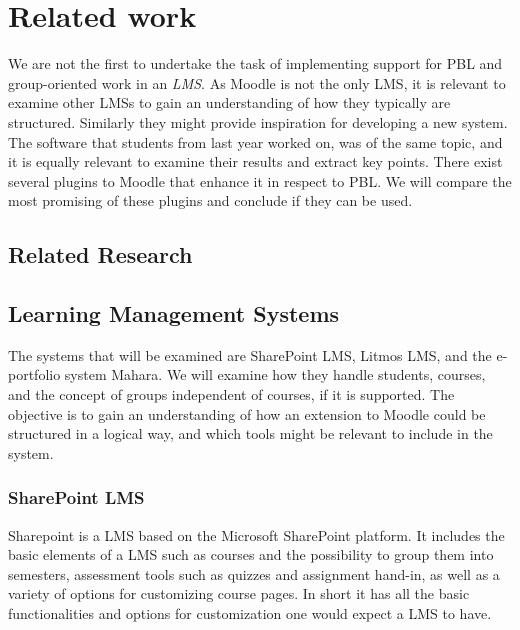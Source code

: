 \section{Related work}
We are not the first to undertake the task of implementing support for PBL and group-oriented work in an \textit{LMS}. 
As Moodle is not the only LMS, it is relevant to examine other LMSs to gain an understanding of how they typically are structured. 
Similarly they might provide inspiration for developing a new system.
The software that students from last year worked on, was of the same topic, and it is equally relevant to examine their results and extract key points.
There exist several plugins to Moodle that enhance it in respect to PBL. We will compare the most promising of these plugins and conclude if they can be used.

\subsection{Related Research}


\subsection{Learning Management Systems}
The systems that will be examined are SharePoint LMS, Litmos LMS, and the e-portfolio system Mahara.
We will examine how they handle students, courses, and the concept of groups independent of courses, if it is supported.
The objective is to gain an understanding of how an extension to Moodle could be structured in a logical way, and which tools might be relevant to include in the system.

\subsubsection{SharePoint LMS} 
Sharepoint \citep{sharepoint1,sharepoint2} is a LMS based on the Microsoft SharePoint platform. 
It includes the basic elements of a LMS such as courses and the possibility to group them into semesters, assessment tools such as quizzes and assignment hand-in, as well as a variety of options for customizing course pages.
In short it has all the basic functionalities and options for customization one would expect a LMS to have.

